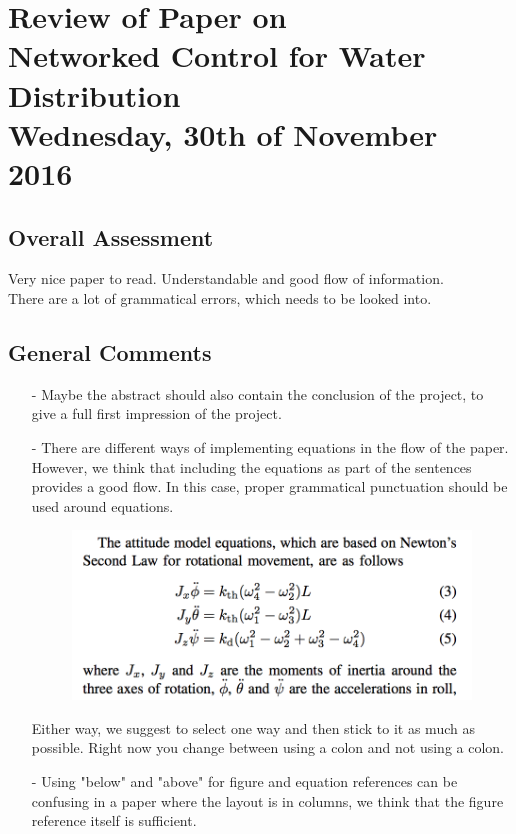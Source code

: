 
\renewcommand{\vec}[1]{\boldsymbol{\mathbf{#1}}}

\renewcommand\chaptername{KAPITEL}
\renewcommand\contentsname{Indhold}
\renewcommand\figurename{Figur}
\renewcommand\tablename{Tabel}

\section*{Review of Paper on\\
Networked Control for Water Distribution\\
\small Wednesday, 30th of November 2016}
\subsection{Overall Assessment}
Very nice paper to read. Understandable and good flow of information. \\
There are a lot of grammatical errors, which needs to be looked into.  
\subsection{General Comments}
\begin{itemize}
	\item[-] Maybe the abstract should also contain the conclusion of the project, to give a full first impression of the project.
	\item[-]There are different ways of implementing equations in the flow of the paper. However, we think that including the equations as part of the sentences provides a good flow. In this case, proper grammatical punctuation should be used around equations.\\
\begin{figure}[H]
    \centering
    \includegraphics[width=.4\textwidth]{equation.PNG}
\end{figure}
Either way, we suggest to select one way and then stick to it as much as possible. Right now you change between using a colon and not using a colon. 
\item[-]Using "below" and "above" for figure and equation references can be confusing in a paper where the layout is in columns, we think that the figure reference itself is sufficient.
\end{itemize}	
